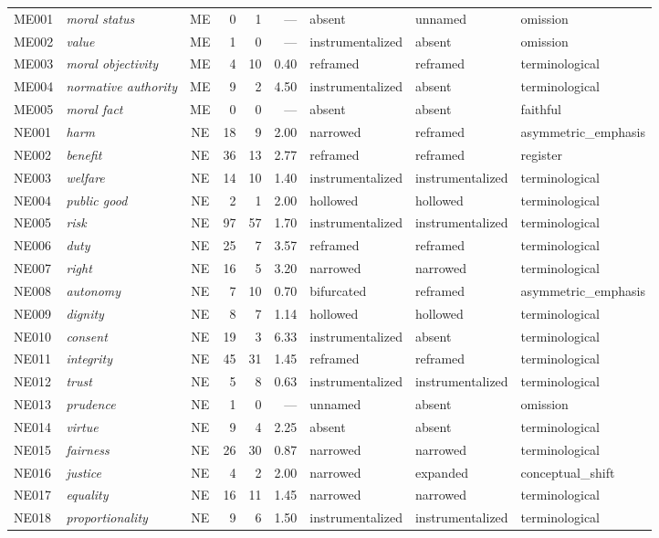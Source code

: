\begin{longtable}{llcrrrllp{2.2cm}}
  ME001 & \textit{moral status} & ME & 0 & 1 & --- & absent & unnamed & omission \\
  ME002 & \textit{value} & ME & 1 & 0 & --- & instrumentalized & absent & omission \\
  ME003 & \textit{moral objectivity} & ME & 4 & 10 & 0.40 & reframed & reframed & terminological \\
  ME004 & \textit{normative authority} & ME & 9 & 2 & 4.50 & instrumentalized & absent & terminological \\
  ME005 & \textit{moral fact} & ME & 0 & 0 & --- & absent & absent & faithful \\
  NE001 & \textit{harm} & NE & 18 & 9 & 2.00 & narrowed & reframed & asymmetric\_emphasis \\
  NE002 & \textit{benefit} & NE & 36 & 13 & 2.77 & reframed & reframed & register \\
  NE003 & \textit{welfare} & NE & 14 & 10 & 1.40 & instrumentalized & instrumentalized & terminological \\
  NE004 & \textit{public good} & NE & 2 & 1 & 2.00 & hollowed & hollowed & terminological \\
  NE005 & \textit{risk} & NE & 97 & 57 & 1.70 & instrumentalized & instrumentalized & terminological \\
  NE006 & \textit{duty} & NE & 25 & 7 & 3.57 & reframed & reframed & terminological \\
  NE007 & \textit{right} & NE & 16 & 5 & 3.20 & narrowed & narrowed & terminological \\
  NE008 & \textit{autonomy} & NE & 7 & 10 & 0.70 & bifurcated & reframed & asymmetric\_emphasis \\
  NE009 & \textit{dignity} & NE & 8 & 7 & 1.14 & hollowed & hollowed & terminological \\
  NE010 & \textit{consent} & NE & 19 & 3 & 6.33 & instrumentalized & absent & terminological \\
  NE011 & \textit{integrity} & NE & 45 & 31 & 1.45 & reframed & reframed & terminological \\
  NE012 & \textit{trust} & NE & 5 & 8 & 0.63 & instrumentalized & instrumentalized & terminological \\
  NE013 & \textit{prudence} & NE & 1 & 0 & --- & unnamed & absent & omission \\
  NE014 & \textit{virtue} & NE & 9 & 4 & 2.25 & absent & absent & terminological \\
  NE015 & \textit{fairness} & NE & 26 & 30 & 0.87 & narrowed & narrowed & terminological \\
  NE016 & \textit{justice} & NE & 4 & 2 & 2.00 & narrowed & expanded & conceptual\_shift \\
  NE017 & \textit{equality} & NE & 16 & 11 & 1.45 & narrowed & narrowed & terminological \\
  NE018 & \textit{proportionality} & NE & 9 & 6 & 1.50 & instrumentalized & instrumentalized & terminological \\
\end{longtable}

